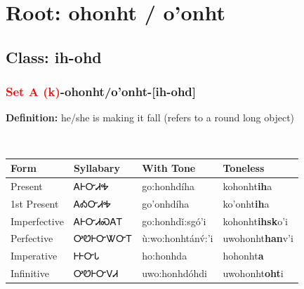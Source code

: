 \needspace{4in}
\section*{Root: ohonht / o'onht}
\nopagebreak
{}
\needspace{3in}
\subsection*{Class: ih-ohd}
\nopagebreak
\needspace{2in}
\subsubsection*{\textcolor{Red}{Set A (k)}{-}\textbf{ohonht/o'onht}{-}[ih-ohd]}
\nopagebreak
\textbf{Definition: } he/she is making it fall (refers to a round{\quotesinglbase} long object)
\\[0.5em]
\begin{tabularx}{\textwidth}{l X X X}%
\toprule%
\textbf{Form}&\textbf{Syllabary}&\textbf{With Tone}&\textbf{Toneless}\\%
\midrule%
Present&ᎪᎰᏅᏗᎭ&go:honhdíha&kohonht\textbf{ih}a\\%
1st Present&ᎪᎣᏅᏗᎭ&go’onhdíha&ko'onht\textbf{ih}a\\%
Imperfective&ᎪᎰᏅᏗᏍᎪᎢ&go:honhdǐ:sgó’i&kohonht\textbf{ihsk}o'i\\%
Perfective&ᎤᏬᎰᏅᏔᏅᎢ&ù:wo:honhtánv́:’i&uwohonht\textbf{han}v'i\\%
Imperative&ᎰᎰᏅᏓ&ho:honhda&hohonht\textbf{a}\\%
Infinitive&ᎤᏬᎰᏅᏙᏗ&uwo:honhdóhdi&uwohonht\textbf{oht}i\\%
\bottomrule%
\end{tabularx}
\\[1em]